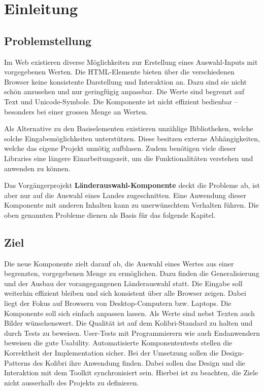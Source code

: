 \chapter{Einleitung}
\label{chap:intro}


\section{Problemstellung}
\label{sec:problem}

Im Web existieren diverse Möglichkeiten zur Erstellung eines Auswahl-Inputs mit vorgegebenen Werten. 
Die HTML-Elemente bieten über die verschiedenen Browser keine konsistente Darstellung und Interaktion an. 
Dazu sind sie nicht schön anzusehen und nur geringfügig anpassbar. 
Die Werte sind begrenzt auf Text und Unicode-Symbole. 
Die Komponente ist nicht effizient bedienbar – besonders bei einer grossen Menge an Werten. 

Als Alternative zu den Basiselementen existieren unzählige Bibliotheken, welche solche Eingabemöglichkeiten unterstützen. 
Diese besitzen externe Abhängigkeiten, welche das eigene Projekt unnötig aufblasen. 
Zudem benötigen viele dieser Libraries eine längere Einarbeitungszeit, um die Funktionalitäten verstehen und anwenden zu können. 

Das Vorgängerprojekt \textbf{Länderauswahl-Komponente} deckt die Probleme ab, ist aber nur auf die Auswahl eines Landes zugeschnitten. 
Eine Anwendung dieser Komponente mit anderen Inhalten kann zu unerwünschtem Verhalten führen. 
Die oben genannten Probleme dienen als Basis für das folgende Kapitel. 


\section{Ziel}
\label{sec:goal}

Die neue Komponente  zielt darauf ab, die Auswahl eines Wertes aus einer begrenzten, vorgegebenen Menge zu ermöglichen.
Dazu finden die Generalisierung und der Ausbau der vorangegangenen Länderauswahl statt. 
Die Eingabe soll weiterhin effizient bleiben und sich konsistent über alle Browser zeigen. 
Dabei liegt der Fokus auf Browsern von Desktop-Computern bzw. Laptops. 
Die Komponente soll sich einfach anpassen lassen.
Als Werte sind nebst Texten auch Bilder wünschenswert. 
Die Qualität ist auf dem Kolibri-Standard zu halten und durch Tests zu beweisen. 
User-Tests mit Programmierern wie auch Endanwendern beweisen die gute Usability.
Automatisierte Komponententests stellen die Korrektheit der Implementation sicher. 
Bei der Umsetzung sollen die Design-Patterns des Kolibri ihre Anwendung finden. 
Dabei sollen das Design und die Interaktion mit dem Toolkit synchronisiert sein. 
Hierbei ist zu beachten, die Ziele nicht ausserhalb des Projekts zu definieren. 


